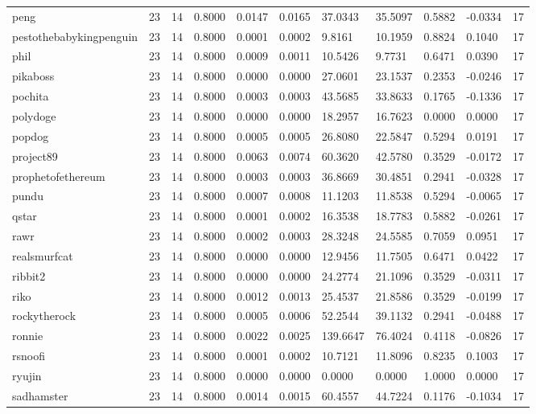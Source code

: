 \begin{table}[htbp]
\begin{tabular}{lllllllllll}
peng & 23 & 14 & 0.8000 & 0.0147 & 0.0165 & 37.0343 & 35.5097 & 0.5882 & -0.0334 & 17 \\
pestothebabykingpenguin & 23 & 14 & 0.8000 & 0.0001 & 0.0002 & 9.8161 & 10.1959 & 0.8824 & 0.1040 & 17 \\
phil & 23 & 14 & 0.8000 & 0.0009 & 0.0011 & 10.5426 & 9.7731 & 0.6471 & 0.0390 & 17 \\
pikaboss & 23 & 14 & 0.8000 & 0.0000 & 0.0000 & 27.0601 & 23.1537 & 0.2353 & -0.0246 & 17 \\
pochita & 23 & 14 & 0.8000 & 0.0003 & 0.0003 & 43.5685 & 33.8633 & 0.1765 & -0.1336 & 17 \\
polydoge & 23 & 14 & 0.8000 & 0.0000 & 0.0000 & 18.2957 & 16.7623 & 0.0000 & 0.0000 & 17 \\
popdog & 23 & 14 & 0.8000 & 0.0005 & 0.0005 & 26.8080 & 22.5847 & 0.5294 & 0.0191 & 17 \\
project89 & 23 & 14 & 0.8000 & 0.0063 & 0.0074 & 60.3620 & 42.5780 & 0.3529 & -0.0172 & 17 \\
prophetofethereum & 23 & 14 & 0.8000 & 0.0003 & 0.0003 & 36.8669 & 30.4851 & 0.2941 & -0.0328 & 17 \\
pundu & 23 & 14 & 0.8000 & 0.0007 & 0.0008 & 11.1203 & 11.8538 & 0.5294 & -0.0065 & 17 \\
qstar & 23 & 14 & 0.8000 & 0.0001 & 0.0002 & 16.3538 & 18.7783 & 0.5882 & -0.0261 & 17 \\
rawr & 23 & 14 & 0.8000 & 0.0002 & 0.0003 & 28.3248 & 24.5585 & 0.7059 & 0.0951 & 17 \\
realsmurfcat & 23 & 14 & 0.8000 & 0.0000 & 0.0000 & 12.9456 & 11.7505 & 0.6471 & 0.0422 & 17 \\
ribbit2 & 23 & 14 & 0.8000 & 0.0000 & 0.0000 & 24.2774 & 21.1096 & 0.3529 & -0.0311 & 17 \\
riko & 23 & 14 & 0.8000 & 0.0012 & 0.0013 & 25.4537 & 21.8586 & 0.3529 & -0.0199 & 17 \\
rockytherock & 23 & 14 & 0.8000 & 0.0005 & 0.0006 & 52.2544 & 39.1132 & 0.2941 & -0.0488 & 17 \\
ronnie & 23 & 14 & 0.8000 & 0.0022 & 0.0025 & 139.6647 & 76.4024 & 0.4118 & -0.0826 & 17 \\
rsnoofi & 23 & 14 & 0.8000 & 0.0001 & 0.0002 & 10.7121 & 11.8096 & 0.8235 & 0.1003 & 17 \\
ryujin & 23 & 14 & 0.8000 & 0.0000 & 0.0000 & 0.0000 & 0.0000 & 1.0000 & 0.0000 & 17 \\
sadhamster & 23 & 14 & 0.8000 & 0.0014 & 0.0015 & 60.4557 & 44.7224 & 0.1176 & -0.1034 & 17 \\

\end{tabular}
\end{table}
